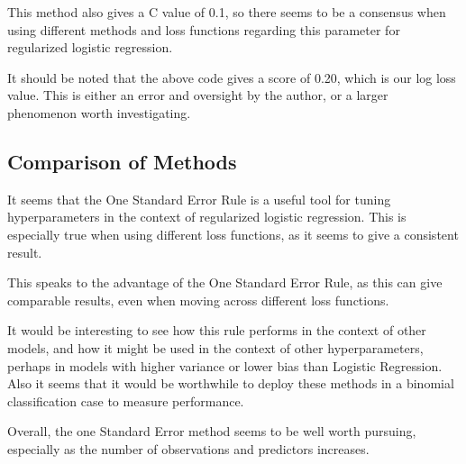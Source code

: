 \documentclass[12pt, letterpaper]{article}
\begin{document}
This method also gives a C value of 0.1, so there seems to be a consensus when using different methods and loss functions regarding this parameter for regularized logistic regression. 

It should be noted that the above code gives a score of 0.20, which is our log loss value. This is either an error and oversight by the author, or a larger phenomenon worth investigating. 

\subsection{Comparison of Methods} 

It seems that the One Standard Error Rule is a useful tool for tuning hyperparameters in the context of regularized logistic regression. This is especially true when using different loss functions, as it seems to give a consistent result. 

This speaks to the advantage of the One Standard Error Rule, as this can give comparable results, even when moving across different loss functions. 

It would be interesting to see how this rule performs in the context of other models, and how it might be used in the context of other hyperparameters, perhaps in models with higher variance or lower bias than Logistic Regression. Also it seems that it would be worthwhile to deploy these methods in a binomial classification case to measure performance. 

Overall, the one Standard Error method seems to be well worth pursuing, especially as the number of observations and predictors increases. 
\end{document}
